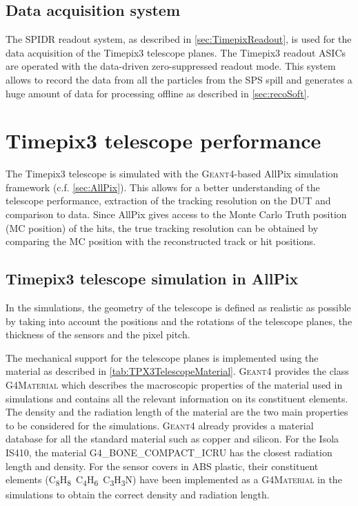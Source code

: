 \subsection{Data acquisition system}
The SPIDR readout system, as described in \cref{sec:TimepixReadout},
is used for the data acquisition of the Timepix3 telescope planes. The
Timepix3 readout ASICs are operated with the data-driven
zero-suppressed readout mode. This system allows to record the data
from all the particles from the SPS spill and generates a huge amount
of data for processing offline as described in \cref{sec:recoSoft}.


\section{Timepix3 telescope performance}
\label{sec:telescopePerformance}

The Timepix3 telescope is simulated with the \textsc{Geant4}-based
AllPix simulation framework (c.f. \cref{sec:AllPix}). This allows for
a better understanding of the telescope performance, extraction of the
tracking resolution on the DUT and comparison to data. Since AllPix
gives access to the Monte Carlo Truth position (MC position) of the
hits, the true tracking resolution can be obtained by comparing the MC
position with the reconstructed track or hit positions.

\subsection{Timepix3 telescope simulation in AllPix}
In the simulations, the geometry of the telescope is defined as
realistic as possible by taking into account the positions and the
rotations of the telescope planes, the thickness of the sensors and
the pixel pitch. 

The mechanical support for the telescope planes is implemented using
the material as described in
\cref{tab:TPX3TelescopeMaterial}. \textsc{Geant4} provides the class
\textsc{G4Material} which describes the macroscopic properties of the
material used in simulations and contains all the relevant information
on its constituent elements. The density and the radiation length of
the material are the two main properties to be considered for the
simulations. \textsc{Geant4} already provides a material database for
all the standard material such as copper and silicon. For the Isola
IS410, the material G4\_BONE\_COMPACT\_ICRU has the closest radiation
length and density. For the sensor covers in ABS plastic, their
constituent elements
(C\textsubscript{8}H\textsubscript{8}~C\textsubscript{4}H\textsubscript{6}~C\textsubscript{3}H\textsubscript{3}N)
have been implemented as a \textsc{G4Material} in the simulations to
obtain the correct density and radiation length.

